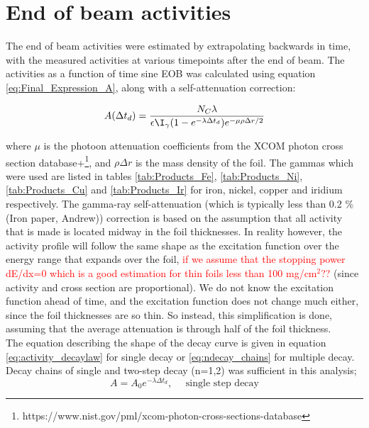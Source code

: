 \section{End of beam activities}

The end of beam activities were estimated by extrapolating backwards in time, with the measured activities at various timepoints after the end of beam. The activities as a function of time sine EOB was calculated using equation \ref{eq:Final_Expression_A}, along with a self-attenuation correction: 

\begin{equation}
    A(\Delta t_d) = \frac{N_C\lambda}{\epsilon\I_\gamma (1-e^{-\lambda \Delta t_d})e^{-\mu\rho\Delta r/2}}
\end{equation}

where $\mu$ is the photoon attenuation coefficients from the XCOM photon cross section database+\footnote{https://www.nist.gov/pml/xcom-photon-cross-sections-database}, and $\rho\Delta r$ is the mass density of the foil. The gammas which were used are listed in tables \ref{tab:Products_Fe}, \ref{tab:Products_Ni}, \ref{tab:Products_Cu} and \ref{tab:Products_Ir} for iron, nickel, copper and iridium respectively. The gamma-ray self-attenuation (which is typically less than 0.2 \% (Iron paper, Andrew)) correction is based on the assumption that all activity that is made is located midway in the foil thicknesses. In reality however, the activity profile will follow the same shape as the excitation function over the energy range that expands over the foil, \textcolor{red}{if we assume that the stopping power dE/dx=0 which is a good estimation for thin foils less than 100 mg/cm$^2$??} (since activity and cross section are proportional). We do not know the excitation function ahead of time, and the excitation function does not change much either, since the foil thicknesses are so thin. So instead, this simplification is done, assuming that the average attenuation is through half of the foil thickness. \\ 

\noindent 
The equation describing the shape of the decay curve is given in equation \ref{eq:activity_decaylaw} for single decay or \ref{eq:ndecay_chains} for multiple decay. Decay chains of single and two-step decay (n=1,2) was sufficient in this analysis; 
\begin{equation} \label{eq:onestep_activity}
    A = A_0 e^{-\lambda \Delta t_d},\quad \text{ single step decay}
\end{equation}

